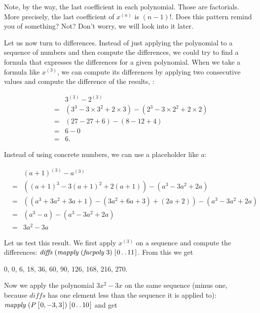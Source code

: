 \documentclass[tikz]{scrreprt}
\newcommand{\Conid}[1]{\mathit{#1}}
\newcommand{\Varid}[1]{\mathit{#1}}
\begin{document}
Note, by the way, the last coefficient in each polynomial.
Those are factorials. More precisely, the last coefficient
of $x^{(n)}$ is $(n-1)!$.
Does this pattern remind you of something?
Not? Don't worry, we will look into it later.

Let us now turn to differences.
Instead of just applying the polynomial to a sequence
of numbers and then compute the differences,
we could try to find a formula that expresses
the differences for a given polynomial.
When we take a formula like $x^{(3)}$,
we can compute its differences by
applying two consecutive values
and compute the difference of the results, \eg:

\[
\begin{array}{ccl}
&   & 3^{(3)} - 2^{(3)} \\
& = & (3^3 - 3\times 3^2 + 2\times 3) -
    (2^3 - 3\times 2^2 + 2\times 2)\\
& = & (27 - 27 + 6) - (8 - 12 + 4) \\
& = & 6 - 0\\
& = & 6.
\end{array}
\]

Instead of using concrete numbers, we can use
a placeholder like $a$:

\[
\begin{array}{ccl}
&   & (a+1)^{(3)} - a^{(3)}\\
& = & ((a+1)^3 - 3(a+1)^2 + 2(a+1)) -
      (a^3 - 3a^2 + 2a)\\
& = & ((a^3 +3a^2 + 3a + 1) - (3a^2+6a+3) + (2a+2)) - 
      (a^3 - 3a^2 + 2a)\\
& = & (a^3 - a) - 
      (a^3 - 3a^2 + 2a)\\
& = & 3a^2 - 3a
\end{array}
\]

Let us test this result.
We first apply $x^{(3)}$ on a sequence
and compute the differences:
\ensuremath{\Varid{diffs}\;(\Varid{mapply}\;(\Varid{facpoly}\;\mathrm{3})\;[\mskip1.5mu \mathrm{0}\mathinner{\ldotp\ldotp}\mathrm{11}\mskip1.5mu]}.
From this we get

0, 0, 6, 18, 36, 60, 90, 126, 168, 216, 270.

Now we apply the polynomial $3x^2 - 3x$
on the same sequence (minus one,
because \ensuremath{\Varid{diffs}} has one element less
than the sequence it is applied to): 
\ensuremath{\Varid{mapply}\;(\Conid{P}\;[\mskip1.5mu \mathrm{0},\mathbin{-}\mathrm{3},\mathrm{3}\mskip1.5mu])\;[\mskip1.5mu \mathrm{0}\mathinner{\ldotp\ldotp}\mathrm{10}\mskip1.5mu]}
and get
\end{document}
